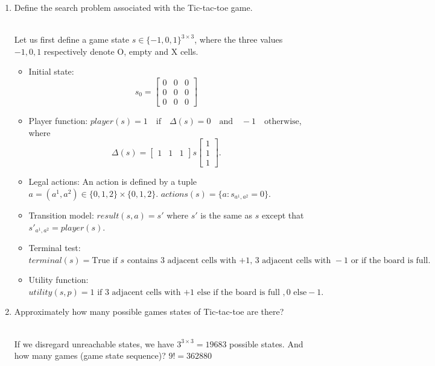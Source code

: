 \documentclass[9pt,a4paper]{extarticle}
\newenvironment{solution}
    {%
    \color{red}
    }
    { 
    \color{black}
    }
\begin{document}
\begin{enumerate}
    \item Define the search problem associated with the Tic-tac-toe game.
    \begin{solution}
    \\
    Let us first define a game state $s \in \{-1, 0, 1\}^{3\times 3}$, where the three values $-1, 0, 1$ respectively denote O, empty and X cells.
    \begin{itemize}
        \item Initial state: $$ s_0 = 
        \begin{bmatrix}
        0 & 0 & 0\\
        0 & 0 & 0\\
        0 & 0 & 0
        \end{bmatrix}
        $$
        \item Player function:
        $
        player(s) = 1 \quad \text{if} \quad \Delta(s) = 0 \quad \text{and} \quad -1 \quad \text{otherwise}
        $, where $$\Delta(s) = \begin{bmatrix}1 & 1 & 1\end{bmatrix}s\begin{bmatrix}1 \\ 1 \\ 1\end{bmatrix}. $$
        \item Legal actions: An action is defined by a tuple $a = (a^1, a^2) \in \{0, 1, 2\}\times \{0, 1, 2\}$.
        $actions(s) = \{a : s_{a^1, a^2} = 0\}$.
        \item Transition model:
        $ result(s, a) = s' $ where $s'$ is the same as $s$ except that $s'_{a^1, a^2} = player(s)$.
        \item Terminal test:
        $terminal(s) = \text{True if } s \text{ contains 3 adjacent cells with +1, 3 adjacent cells with } -1\text{ or if the board is full}.$
        \item Utility function: $utility(s, p) = 1 \text{ if 3 adjacent cells with +1 else if the board is full }, 0 \text{ else} -1. $
    \end{itemize}
    \end{solution}
    \item Approximately how many possible games states of Tic-tac-toe are there?
    \begin{solution}
    \\
    If we disregard unreachable states, we have $3^{ 3 \times 3} = 19683$ possible states. And how many games (game state sequence)? $9! = 362880 $ 

\end{solution}
\end{enumerate}
\end{document}
